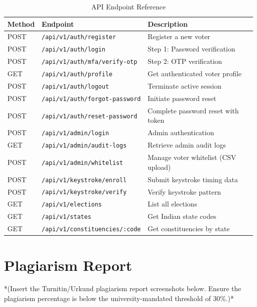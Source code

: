 \documentclass[oneside,a4paper,12pt]{book}
\begin{document}
\begin{appendices}
\begin{table}[htbp]
\centering
\renewcommand{\arraystretch}{1.2}
\footnotesize
\begin{tabularx}{\textwidth}{|p{1.2cm}|p{5.5cm}|X|}
\hline
\textbf{Method} & \textbf{Endpoint} & \textbf{Description} \\
\hline
POST & \texttt{/api/v1/auth/register} & Register a new voter \\
\hline
POST & \texttt{/api/v1/auth/login} & Step 1: Password verification \\
\hline
POST & \texttt{/api/v1/auth/mfa/verify-otp} & Step 2: OTP verification \\
\hline
GET & \texttt{/api/v1/auth/profile} & Get authenticated voter profile \\
\hline
POST & \texttt{/api/v1/auth/logout} & Terminate active session \\
\hline
POST & \texttt{/api/v1/auth/forgot-password} & Initiate password reset \\
\hline
POST & \texttt{/api/v1/auth/reset-password} & Complete password reset with token \\
\hline
POST & \texttt{/api/v1/admin/login} & Admin authentication \\
\hline
GET & \texttt{/api/v1/admin/audit-logs} & Retrieve admin audit logs \\
\hline
POST & \texttt{/api/v1/admin/whitelist} & Manage voter whitelist (CSV upload) \\
\hline
POST & \texttt{/api/v1/keystroke/enroll} & Submit keystroke timing data \\
\hline
POST & \texttt{/api/v1/keystroke/verify} & Verify keystroke pattern \\
\hline
GET & \texttt{/api/v1/elections} & List all elections \\
\hline
GET & \texttt{/api/v1/states} & Get Indian state codes \\
\hline
GET & \texttt{/api/v1/constituencies/:code} & Get constituencies by state \\
\hline
\end{tabularx}
\caption{API Endpoint Reference}
\label{tab:api}
\end{table}

\chapter{Plagiarism Report}

*(Insert the Turnitin/Urkund plagiarism report screenshots below. Ensure the plagiarism percentage is below the university-mandated threshold of 30\%.)*


\end{appendices}
\end{document}
